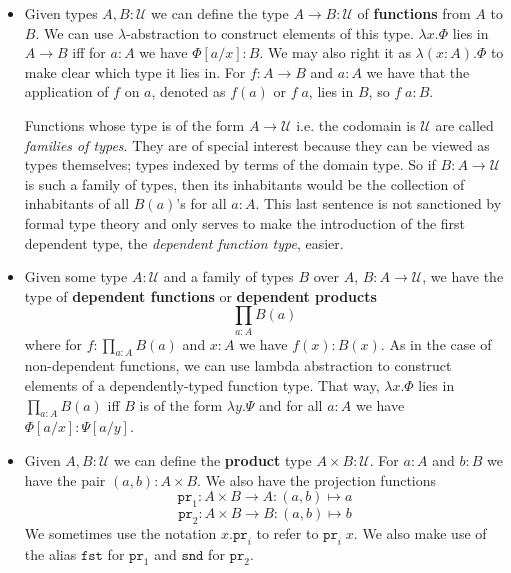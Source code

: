 \documentclass[12pt]{report}
\theoremstyle{definition}
\begin{document}
\begin{itemize}
	\item Given types $A, B : \mathcal{U}$ we can define the type $A \rightarrow B : \mathcal{U}$ of \textbf{functions} from $A$ to $B$. 
		We can use $\lambda$-abstraction to construct elements of this type. $\lambda x. \Phi$ lies in $A \rightarrow B$ iff for $a : A$ we have $\Phi[a/x] : B$. 
		We may also right it as $\lambda (x : A). \Phi$ to make clear which type it lies in. 
		For $f : A \rightarrow B$ and $a : A$ we have that the application of $f$ on $a$, denoted as $f(a)$ or $f\;a$, lies in $B$, so $f\;a : B$. 

		Functions whose type is of the form $A \rightarrow \mathcal{U}$ i.e. the codomain is $\mathcal{U}$ are called \textit{families of types}. 
		They are of special interest because they can be viewed as types themselves; types indexed by terms of the domain type. 
		So if $B : A \rightarrow \mathcal{U}$ is such a family of types, then its inhabitants would be the collection of inhabitants of all $B(a)$'s for all $a  : A$. 
		This last sentence is not sanctioned by formal type theory and only serves to make the introduction of the first dependent type, the \textit{dependent function type}, easier.
	\item Given some type $A : \mathcal{U}$ and a family of types $B$ over $A$, $B : A \rightarrow \mathcal{U}$, we have the type of \textbf{dependent functions} or \textbf{dependent products} $$\prod_{a : A} B(a)$$
	where for $f : \prod_{a : A} B(a)$ and $x : A$ we have $f(x) : B(x)$. 
	As in the case of non-dependent functions, we can use lambda abstraction to construct elements of a dependently-typed function type. 
	That way, $\lambda x.\Phi$ lies in $\prod_{a:A}B(a)$ iff $B$ is of the form $\lambda y.\Psi$ and for all $a:A$ we have $\Phi[a/x] : \Psi[a/y]$. 
	\item Given $A, B : \mathcal{U}$ we can define the \textbf{product} type $A \times B : \mathcal{U}$. 
	For $a : A$ and $b : B$ we have the pair $(a,b) : A \times B$. 
	We also have the projection functions 
	$$\mathtt{pr}_1 : A \times B \rightarrow A : (a,b) \mapsto a$$
	$$\mathtt{pr}_2 : A \times B \rightarrow B : (a,b) \mapsto b$$
	We sometimes use the notation $x.\mathtt{pr}_i$ to refer to $\mathtt{pr}_i\; x$. 
	We also make use of the alias $\mathtt{fst}$ for $\mathtt{pr}_1$ and $\mathtt{snd}$ for $\mathtt{pr}_2$. 


\end{itemize}
\end{document}
